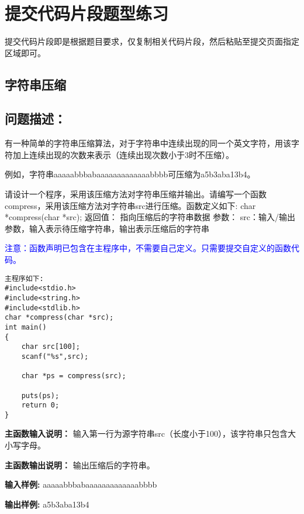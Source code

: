 %
%
%
\chapter{提交代码片段题型练习}  

提交代码片段即是根据题目要求，仅复制相关代码片段，然后粘贴至提交页面指定区域即可。

\section{字符串压缩}

\section*{问题描述：}

有一种简单的字符串压缩算法，对于字符串中连续出现的同一个英文字符，用该字符加上连续出现的次数来表示（连续出现次数小于3时不压缩）。

例如，字符串aaaaabbbabaaaaaaaaaaaaabbbb可压缩为a5b3aba13b4。

请设计一个程序，采用该压缩方法对字符串压缩并输出。请编写一个函数compress，采用该压缩方法对字符串src进行压缩。函数定义如下:
char *compress(char *src);
返回值：
指向压缩后的字符串数据
参数：
src：输入/输出参数，输入表示待压缩字符串，输出表示压缩后的字符串

\textcolor{blue}{注意：函数声明已包含在主程序中，不需要自己定义。只需要提交自定义的函数代码。}

\begin{lstlisting}[frame=none]
主程序如下:
#include<stdio.h>
#include<string.h>
#include<stdlib.h>
char *compress(char *src);
int main()
{
	char src[100];
	scanf("%s",src);
	
	char *ps = compress(src);
	
	puts(ps);
	return 0;
}
\end{lstlisting}

\textbf{主函数输入说明：} 输入第一行为源字符串src（长度小于100），该字符串只包含大小写字母。

\textbf{主函数输出说明：} 输出压缩后的字符串。

\textbf{输入样例: } aaaaabbbabaaaaaaaaaaaaabbbb

\textbf{输出样例: } a5b3aba13b4

